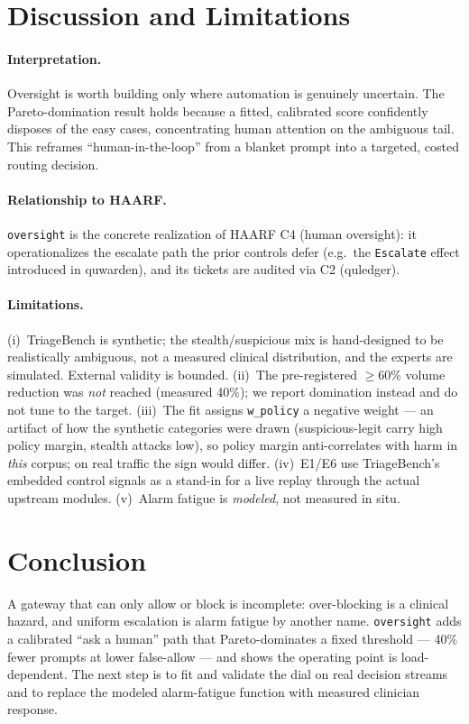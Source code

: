 \documentclass[11pt]{article}
\providecommand{\VolReduction}{40\%}
\begin{document}
\section{Discussion and Limitations}
\paragraph{Interpretation.} Oversight is worth building only where automation is
genuinely uncertain. The Pareto-domination result holds because a fitted, calibrated
score confidently disposes of the easy cases, concentrating human attention on the
ambiguous tail. This reframes ``human-in-the-loop'' from a blanket prompt into a
targeted, costed routing decision.

\paragraph{Relationship to HAARF.} \texttt{oversight} is the concrete realization of
HAARF C4 (human oversight): it operationalizes the escalate path the prior controls
defer (e.g.\ the \texttt{Escalate} effect introduced in quwarden), and its tickets
are audited via C2 (quledger).

\paragraph{Limitations.} (i)~TriageBench is synthetic; the stealth/suspicious mix is
hand-designed to be realistically ambiguous, not a measured clinical distribution, and
the experts are simulated. External validity is bounded. (ii)~The pre-registered
$\geq$60\% volume reduction was \emph{not} reached (measured \VolReduction{}); we report
domination instead and do not tune to the target. (iii)~The fit assigns
\texttt{w\_policy} a negative weight --- an artifact of how the synthetic categories were
drawn (suspicious-legit carry high policy margin, stealth attacks low), so policy margin
anti-correlates with harm in \emph{this} corpus; on real traffic the sign would differ.
(iv)~E1/E6 use TriageBench's embedded control signals as a stand-in for a live replay
through the actual upstream modules. (v)~Alarm fatigue is \emph{modeled}, not measured
in situ.

\section{Conclusion}
A gateway that can only allow or block is incomplete: over-blocking is a clinical
hazard, and uniform escalation is alarm fatigue by another name. \texttt{oversight}
adds a calibrated ``ask a human'' path that Pareto-dominates a fixed threshold ---
\VolReduction{} fewer prompts at lower false-allow --- and shows the operating point is
load-dependent. The next step is to fit and validate the dial on real decision streams
and to replace the modeled alarm-fatigue function with measured clinician response.
\end{document}
